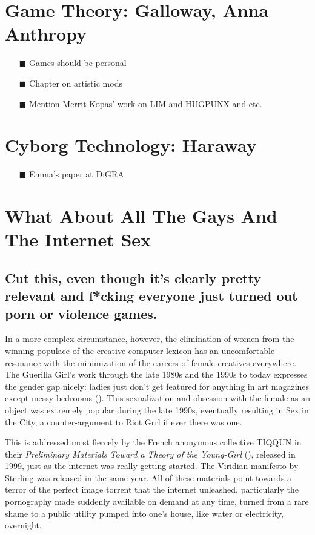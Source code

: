 \section{Game Theory: Galloway, Anna Anthropy}
\begin{itemize}
\item[\tiny{$\blacksquare$}] Games should be personal
\item[\tiny{$\blacksquare$}] Chapter on artistic mods
\item[\tiny{$\blacksquare$}] Mention Merrit Kopas' work on LIM and HUGPUNX and etc.
\end{itemize}

\section{Cyborg Technology: Haraway}
\begin{itemize}
\item[\tiny{$\blacksquare$}] Emma's paper at DiGRA
\end{itemize}

\section{What About All The Gays And The Internet Sex}
\subsection{Cut this, even though it's clearly pretty relevant and f*cking everyone just turned out porn or violence games.}
In a more complex circumstance, however, the elimination of women from the winning populace of the creative computer lexicon has an uncomfortable resonance with the minimization of the careers of female creatives everywhere. The Guerilla Girl's work through the late 1980s and the 1990s to today expresses the gender gap nicely: ladies just don't get featured for anything in art magazines except messy bedrooms (\cite{emin}). This sexualization and obsession with the female as an object was extremely popular during the late 1990s, eventually resulting in Sex in the City, a counter-argument to Riot Grrl if ever there was one. 

This is addressed most fiercely by the French anonymous collective TIQQUN in their \textit{Preliminary Materials Toward a Theory of the Young-Girl} (\cite{tiqqun}), released in 1999, just as the internet was really getting started. The Viridian manifesto by Sterling was released in the same year. All of these materials point towards a terror of the perfect image torrent that the internet unleashed, particularly the pornography made suddenly available on demand at any time, turned from a rare shame to a public utility pumped into one's house, like water or electricity, overnight.

